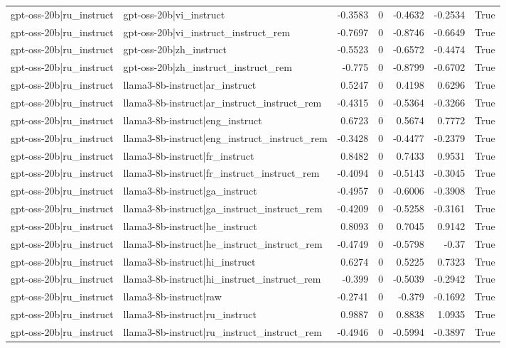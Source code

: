 \begin{table}
\begin{tabular}{l l r r r r l}
gpt-oss-20b|ru_instruct & gpt-oss-20b|vi_instruct & -0.3583 & 0 & -0.4632 & -0.2534 & True \\
gpt-oss-20b|ru_instruct & gpt-oss-20b|vi_instruct_instruct_rem & -0.7697 & 0 & -0.8746 & -0.6649 & True \\
gpt-oss-20b|ru_instruct & gpt-oss-20b|zh_instruct & -0.5523 & 0 & -0.6572 & -0.4474 & True \\
gpt-oss-20b|ru_instruct & gpt-oss-20b|zh_instruct_instruct_rem & -0.775 & 0 & -0.8799 & -0.6702 & True \\
gpt-oss-20b|ru_instruct & llama3-8b-instruct|ar_instruct & 0.5247 & 0 & 0.4198 & 0.6296 & True \\
gpt-oss-20b|ru_instruct & llama3-8b-instruct|ar_instruct_instruct_rem & -0.4315 & 0 & -0.5364 & -0.3266 & True \\
gpt-oss-20b|ru_instruct & llama3-8b-instruct|eng_instruct & 0.6723 & 0 & 0.5674 & 0.7772 & True \\
gpt-oss-20b|ru_instruct & llama3-8b-instruct|eng_instruct_instruct_rem & -0.3428 & 0 & -0.4477 & -0.2379 & True \\
gpt-oss-20b|ru_instruct & llama3-8b-instruct|fr_instruct & 0.8482 & 0 & 0.7433 & 0.9531 & True \\
gpt-oss-20b|ru_instruct & llama3-8b-instruct|fr_instruct_instruct_rem & -0.4094 & 0 & -0.5143 & -0.3045 & True \\
gpt-oss-20b|ru_instruct & llama3-8b-instruct|ga_instruct & -0.4957 & 0 & -0.6006 & -0.3908 & True \\
gpt-oss-20b|ru_instruct & llama3-8b-instruct|ga_instruct_instruct_rem & -0.4209 & 0 & -0.5258 & -0.3161 & True \\
gpt-oss-20b|ru_instruct & llama3-8b-instruct|he_instruct & 0.8093 & 0 & 0.7045 & 0.9142 & True \\
gpt-oss-20b|ru_instruct & llama3-8b-instruct|he_instruct_instruct_rem & -0.4749 & 0 & -0.5798 & -0.37 & True \\
gpt-oss-20b|ru_instruct & llama3-8b-instruct|hi_instruct & 0.6274 & 0 & 0.5225 & 0.7323 & True \\
gpt-oss-20b|ru_instruct & llama3-8b-instruct|hi_instruct_instruct_rem & -0.399 & 0 & -0.5039 & -0.2942 & True \\
gpt-oss-20b|ru_instruct & llama3-8b-instruct|raw & -0.2741 & 0 & -0.379 & -0.1692 & True \\
gpt-oss-20b|ru_instruct & llama3-8b-instruct|ru_instruct & 0.9887 & 0 & 0.8838 & 1.0935 & True \\
gpt-oss-20b|ru_instruct & llama3-8b-instruct|ru_instruct_instruct_rem & -0.4946 & 0 & -0.5994 & -0.3897 & True \\

\end{tabular}
\end{table}
